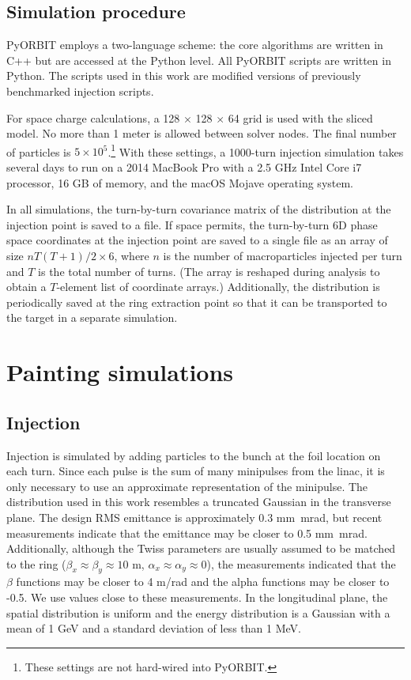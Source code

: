 \subsection{Simulation procedure}

PyORBIT employs a two-language scheme: the core algorithms are written in C++ but are accessed at the Python level. All PyORBIT scripts are written in Python. The scripts used in this work are modified versions of previously benchmarked injection scripts.

For space charge calculations, a 128 $\times$ 128 $\times$ 64 grid is used with the sliced model. No more than 1 meter is allowed between solver nodes. The final number of particles is $5 \times 10^{5}$.\footnote{These settings are not hard-wired into PyORBIT.} With these settings, a 1000-turn injection simulation takes several days to run on a 2014 MacBook Pro with a 2.5 GHz Intel Core i7 processor, 16 GB of memory, and the macOS Mojave operating system.

In all simulations, the turn-by-turn covariance matrix of the distribution at the injection point is saved to a file. If space permits, the turn-by-turn 6D phase space coordinates at the injection point are saved to a single file as an array of size $n T (T + 1) / 2 \times 6$, where $n$ is the number of macroparticles injected per turn and $T$ is the total number of turns. (The array is reshaped during analysis to obtain a $T$-element list of coordinate arrays.) Additionally, the distribution is periodically saved at the ring extraction point so that it can be transported to the target in a separate simulation.





\section{Painting simulations}

\subsection{Injection}

Injection is simulated by adding particles to the bunch at the foil location on each turn. Since each pulse is the sum of many minipulses from the linac, it is only necessary to use an approximate representation of the minipulse. The distribution used in this work resembles a truncated Gaussian in the transverse plane. The design RMS emittance is approximately 0.3 mm~mrad, but recent measurements indicate that the emittance may be closer to 0.5 mm~mrad. Additionally, although the Twiss parameters are usually assumed to be matched to the ring ($\beta_x \approx \beta_y \approx 10$ m, $\alpha_x \approx \alpha_y \approx 0$), the measurements indicated that the $\beta$ functions may be closer to 4 m/rad and the alpha functions may be closer to -0.5. We use values close to these measurements. In the longitudinal plane, the spatial distribution is uniform and the energy distribution is a Gaussian with a mean of 1 GeV and a standard deviation of less than 1 MeV.

